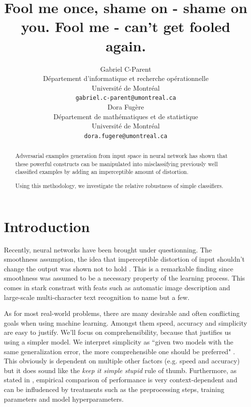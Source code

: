 \documentclass{article} %
\author{
Gabriel C-Parent\\
Département d’informatique et recherche opérationnelle\\
Université de Montréal\\
\texttt{gabriel.c-parent@umontreal.ca} \\
\And
Dora Fugère \\
Département de mathématiques et de statistique \\
Université de Montréal\\
\texttt{dora.fugere@umontreal.ca} \\
}
\begin{document}
\title{Fool me once, shame on - shame on you. \newline
       Fool me - can't get fooled again.}
      
\maketitle

\begin{abstract}
Adversarial examples generation from input space in neural network
has shown that these powerful constructs can be manipulated into misclassifying previously well classified examples by adding an imperceptible
amount of distortion.

Using this methodology, we investigate the relative robustness of
simple classifiers.
\end{abstract}


\section{Introduction}

Recently, neural networks have been brought under questionning. The smoothness
assumption, the idea that imperceptible distortion of input shouldn't change
the output was shown not to hold \citep{szegedy_intriguing_2013}. This is a
remarkable finding since smoothness was assumed to be a necessary property of the
learning process.
This comes in stark constrast with feats such as automatic image description
\citep{vinyals_show_2014} and large-scale multi-character text recognition
\citep{goodfellow_multi-digit_2013} to name but a few.

As for most real-world problems, there are many desirable and often conflicting
goals when using machine learning. Amongst them speed, accuracy and simplicity
are easy to justify. We'll focus on comprehensibility, because that justifies
us using a simpler model.
We interpret simplicity as ``given two models with the same generalization error, the more
comprehensible one should be preferred" \citep{domingos_role_1999}.
This obviously is dependent on multiple other factors (e.g. speed and accuracy)
but it does sound like the \textit{keep it simple stupid} rule of thumb.
Furthermore, as stated in \citep{hand_classifier_2006}, empirical comparison of
performance is very context-dependent and can be infludenced by treatments such 
as the preprocessing steps, training parameters and model hyperparameters.
\end{document}
